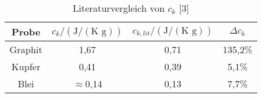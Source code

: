 \begin{table}[h]
	\begin{center}
		\begin{tabular}{cccc}
			Probe&$c_k/(\text{J}/(\text{K } \text{g}))$&$c_{k,lit}/(\text{J}/(\text{K } \text{g}))$&$\Delta c_k$ \\ \hline
			Graphit&1,67&0,71&135,2\%\\
			Kupfer&0,41&0,39&5,1\%\\
			Blei&$\approx$0,14&0,13&7,7\%
		\end{tabular}
		\caption{Literaturvergleich von $c_k$ [3]}
		\label{tadisslit}
	\end{center}
\end{table}